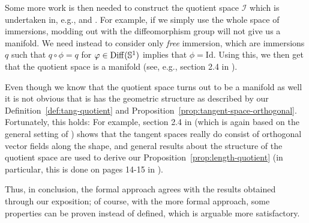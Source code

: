 Some more work is then needed to construct the quotient space $\mathcal{I}$ which is undertaken in, e.g., \cite{michor2003riemannian} and \cite{cervera1991action}. For example, if we simply use the whole space of immersions, modding out with the diffeomorphism group will not give us a manifold. We need instead to consider only \textit{free} immersion, which are immersions $q$ such that $q \circ \phi = q$ for $\phi \in \mathrm{Diff}(\S^1)$ implies that $\phi = \mathrm{Id}$. Using this, we then get that the quotient space is a manifold (see, e.g., section 2.4 in \cite{michor2003riemannian}).

Even though we know that the quotient space turns out to be a manifold as well it is not obvious that is has the geometric structure as described by our Definition~\ref{def:tang-quotient} and Proposition~\ref{prop:tangent-space-orthogonal}. Fortunately, this holds: For example, section 2.4 in \cite{michor2003riemannian} (which is again based on the general setting of \cite{kriegl1997convenient}) shows that the tangent spaces really do consist of orthogonal vector fields along the shape, and general results about the structure of the quotient space are used to derive our Proposition~\ref{prop:length-quotient} (in particular, this is done on pages 14-15 in \cite{michor2003riemannian}).

Thus, in conclusion, the formal approach agrees with the results obtained through our exposition; of course, with the more formal approach, some properties can be proven instead of defined, which is arguable more satisfactory.




